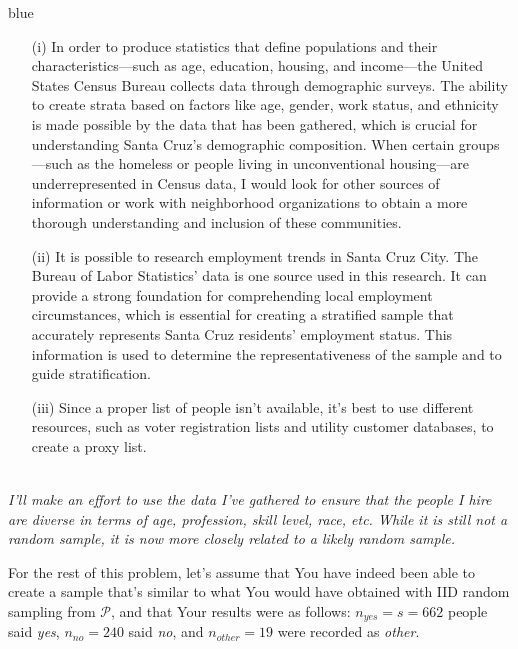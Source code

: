 \documentclass[12pt]{article}
\begin{document}
\begin{itemize}
\begin{itemize}
\begin{Solution}{blue}
\begin{itemize}
    \item [(i)]
    In order to produce statistics that define populations and their characteristics—such as age, education, housing, and income—the United States Census Bureau collects data through demographic surveys. The ability to create strata based on factors like age, gender, work status, and ethnicity is made possible by the data that has been gathered, which is crucial for understanding Santa Cruz's demographic composition. When certain groups—such as the homeless or people living in unconventional housing—are underrepresented in Census data, I would look for other sources of information or work with neighborhood organizations to obtain a more thorough understanding and inclusion of these communities.

    \item[(ii)]
    It is possible to research employment trends in Santa Cruz City. The Bureau of Labor Statistics' data is one source used in this research. It can provide a strong foundation for comprehending local employment circumstances, which is essential for creating a stratified sample that accurately represents Santa Cruz residents' employment status. This information is used to determine the representativeness of the sample and to guide stratification.

    \item [(iii)]
    Since a proper list of people isn't available, it's best to use different resources, such as voter registration lists and utility customer databases, to create a proxy list.

\end{itemize}
\\
\textit{I'll make an effort to use the data I've gathered to ensure that the people I hire are diverse in terms of age, profession, skill level, race, etc. While it is still not a random sample, it is now more closely related to a likely random sample.}

\end{Solution}



\end{itemize}

\vspace*{3.25in}

\end{itemize}

For the rest of this problem, let's assume that You have indeed been able to create a sample that's similar to what You would have obtained with IID random sampling from $\mathcal{ P }$, and that Your results were as follows: $n_{ yes } = s = 662$ people said \textit{yes}, $n_{ no } = 240$ said \textit{no}, and $n_{ other } = 19$ were recorded as \textit{other}.
\end{document}
